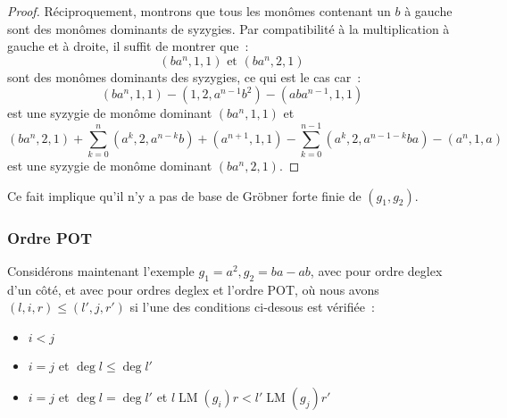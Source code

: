 \documentclass{article}
\DeclareMathOperator{\LM}{LM}
\begin{document}
\begin{proof}
	Réciproquement, montrons que tous les monômes contenant un $b$ à gauche sont des monômes dominants de syzygies.
	Par compatibilité à la multiplication à gauche et à droite, il suffit de montrer que~:
	$$(ba^n, 1, 1) \mbox{ et } (ba^n, 2, 1)$$
	sont des monômes dominants des syzygies, ce qui est le cas car~:
	$$(ba^n, 1, 1) - (1, 2, a^{n - 1}b^2) - (aba^{n - 1}, 1, 1)$$
	est une syzygie de monôme dominant $(ba^n, 1, 1)$ et
	$$(ba^n, 2, 1) + \sum_{k = 0}^{n} (a^k, 2, a^{n - k}b) + (a^{n+1}, 1, 1) - \sum_{k = 0}^{n - 1} (a^k, 2, a^{n - 1 - k}ba) - (a^n, 1, a)$$
	est une syzygie de monôme dominant $(ba^n, 2, 1)$.	
\end{proof}

Ce fait implique qu'il n'y a pas de base de Gröbner forte finie de $(g_1, g_2)$.

\subsubsection*{Ordre POT}

Considérons maintenant l'exemple $g_1 = a^2, g_2 = ba - ab$, avec pour ordre deglex d'un côté, et avec pour ordres deglex et l'ordre POT, où
nous avons $(l, i, r) \leq (l', j, r')$ si l'une des conditions ci-desous est vérifiée~:
\begin{itemize}
	\item $i < j$
	\item $i = j$ et $\deg{l} \leq \deg{l'}$
	\item $i = j$ et $\deg{l} = \deg{l'}$ et $l\LM(g_i)r < l'\LM(g_j)r'$
\end{itemize}
\end{document}
